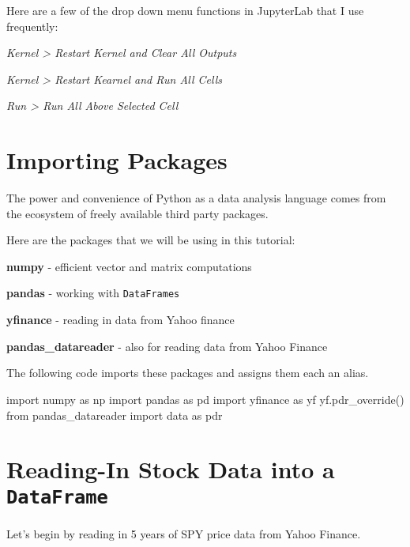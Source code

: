 \documentclass[
  letterpaper,
  DIV=11,
  numbers=noendperiod]{scrreprt}
\newenvironment{Shaded}{\begin{snugshade}}{\end{snugshade}}
\newcommand{\ImportTok}[1]{\textcolor[rgb]{0.00,0.46,0.62}{#1}}
\newcommand{\NormalTok}[1]{\textcolor[rgb]{0.00,0.23,0.31}{#1}}
\begin{document}
Here are a few of the drop down menu functions in JupyterLab that I use
frequently:

\emph{Kernel \textgreater{} Restart Kernel and Clear All Outputs}

\emph{Kernel \textgreater{} Restart Kearnel and Run All Cells}

\emph{Run \textgreater{} Run All Above Selected Cell}

\hypertarget{importing-packages}{%
\section{Importing Packages}\label{importing-packages}}

The power and convenience of Python as a data analysis language comes
from the ecosystem of freely available third party packages.

Here are the packages that we will be using in this tutorial:

\textbf{numpy} - efficient vector and matrix computations

\textbf{pandas} - working with \texttt{DataFrames}

\textbf{yfinance} - reading in data from Yahoo finance

\textbf{pandas\_datareader} - also for reading data from Yahoo Finance

The following code imports these packages and assigns them each an
alias.

\begin{Shaded}
\begin{Highlighting}[]
\ImportTok{import}\NormalTok{ numpy }\ImportTok{as}\NormalTok{ np}
\ImportTok{import}\NormalTok{ pandas }\ImportTok{as}\NormalTok{ pd}
\ImportTok{import}\NormalTok{ yfinance }\ImportTok{as}\NormalTok{ yf}
\NormalTok{yf.pdr\_override()}
\ImportTok{from}\NormalTok{ pandas\_datareader }\ImportTok{import}\NormalTok{ data }\ImportTok{as}\NormalTok{ pdr}
\end{Highlighting}
\end{Shaded}

\hypertarget{reading-in-stock-data-into-a-dataframe}{%
\section{\texorpdfstring{Reading-In Stock Data into a
\texttt{DataFrame}}{Reading-In Stock Data into a DataFrame}}\label{reading-in-stock-data-into-a-dataframe}}

Let's begin by reading in 5 years of SPY price data from Yahoo Finance.
\end{document}

